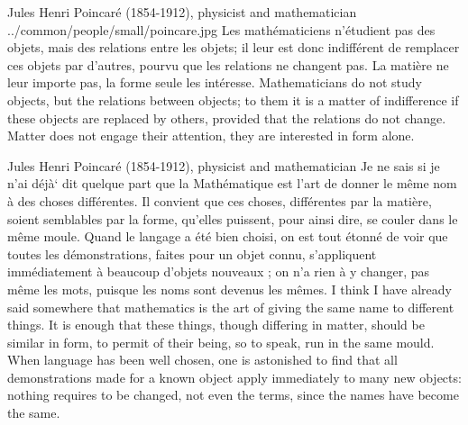 \qboxnpqt
  { Jules Henri Poincar\'e (1854-1912), physicist and mathematician
    \footnotemark
  }
  {../common/people/small/poincare.jpg}
  {Les math\'ematiciens n'\'etudient pas des objets,
   mais des relations entre les objets;
   il leur est donc indiff\'erent de remplacer ces objets par d'autres,
   pourvu que les relations ne changent pas.
   La mati\`ere ne leur importe pas, la forme seule les int\'eresse.}
  {Mathematicians do not study objects, but the relations between objects;
   to them it is a matter of indifference if these objects are replaced by others,
   provided that the relations do not change.
   Matter does not engage their attention,
   they are interested in form alone.}

\qboxnqt
  {
    Jules Henri Poincar\'e (1854-1912), physicist and mathematician
    \footnotemark
  }
  {Je ne sais si je n'ai d\'ej\`a` dit quelque part que la Math\'ematique est
  l'art de donner le m\^eme nom \`a des choses diff\'erentes.
  Il convient que ces choses, diff\'erentes par la mati\`ere,
  soient semblables par la forme, qu'elles puissent,
  pour ainsi dire, se couler dans le m\^eme moule.
  Quand le langage a \'et\'e bien choisi, on est tout \'etonn\'e
  de voir que toutes les d\'emonstrations, faites pour un objet connu,
  s'appliquent imm\'ediatement \`a beaucoup d'objets nouveaux ;
  on n'a rien \`a y changer, pas m\^eme les mots, puisque les noms sont devenus les m\^emes.}
  {I think I have already said somewhere that mathematics is the art
   of giving the same name to different things.
   It is enough that these things, though differing in matter,
   should be similar in form, to permit of their being, so to speak,
   run in the same mould.
   When language has been well chosen, one is astonished to find that all
   demonstrations made for a known object apply immediately to many new objects:
   nothing requires to be changed, not even the terms,
   since the names have become the same.}


